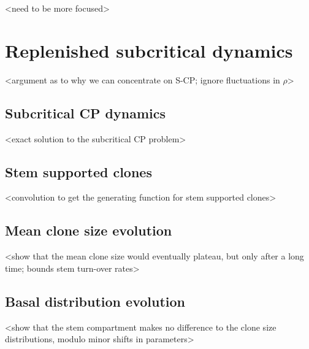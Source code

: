 \documentclass[10pt,UKenglish]{article}
\begin{document}
<need to be more focused>

\section{Replenished subcritical dynamics}

<argument as to why we can concentrate on S-CP; ignore fluctuations in $\rho$>

\subsection{Subcritical CP dynamics}

<exact solution to the subcritical CP problem>

\subsection{Stem supported clones}

<convolution to get the generating function for stem supported clones>

\subsection{Mean clone size evolution}

<show that the mean clone size would eventually plateau, but only after a long time; bounds stem turn-over rates>

\subsection{Basal distribution evolution}

<show that the stem compartment makes no difference to the clone size distributions, modulo minor shifts in parameters>
\end{document}
